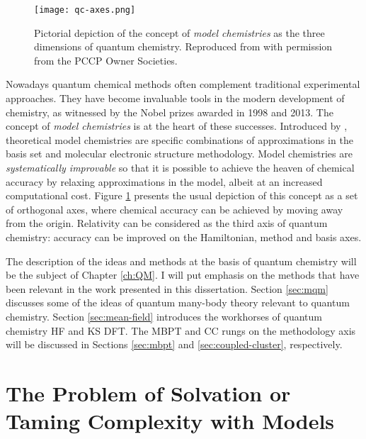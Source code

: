 \begin{figure}[tb]
\centering
\texttt{[image: qc-axes.png]}
\caption[Pictorial depiction of the concept of \emph{model chemistries}.]{
Pictorial depiction of the concept of \emph{model chemistries} as the
three dimensions of quantum chemistry.\autocite{Pople1999-gt, Saue2011-qg}
Reproduced from  with permission from the PCCP Owner Societies.
}
\label{fig:RQC-axis}
\end{figure}

 Nowadays
quantum chemical methods often complement traditional experimental
approaches. They have become invaluable tools in the modern development
of chemistry,\autocite{Lee1995-pw, Helgaker2004-oz, Tajti2004-ye} as
witnessed by the Nobel prizes awarded in 1998\autocite{Nobel1998} and
2013.\autocite{Nobel2013}
The concept of \emph{model chemistries} is at the heart of these
successes. Introduced by \citeauthor{Pople1999-gt}, theoretical model
chemistries are specific combinations of approximations in the basis set
and molecular electronic structure methodology.\autocite{Pople1999-gt}
Model chemistries are \emph{systematically improvable} so that it is
possible to achieve the heaven of chemical accuracy by relaxing
approximations in the model, albeit at an increased computational cost.
Figure \ref{fig:RQC-axis} presents the usual depiction of this concept
as a set of orthogonal axes, where chemical accuracy can be achieved by
moving away from the origin.
Relativity can be considered as the third axis of quantum
chemistry: accuracy can be improved on the Hamiltonian, method
and basis axes.\autocite{Saue2011-qg}

The description of the ideas and methods at the basis of quantum
chemistry will be the subject of Chapter \ref{ch:QM}.
I will put emphasis on the methods that have been relevant in the work
presented in this dissertation. Section \ref{sec:mqm} discusses some of the
ideas of quantum many-body theory relevant to quantum chemistry. Section
\ref{sec:mean-field} introduces the workhorses of quantum chemistry
\acrlong*{HF} and \acrlong*{KS} \acrlong*{DFT}.
The \acrlong*{MBPT} and \acrlong*{CC} rungs on the methodology axis will
be discussed in Sections \ref{sec:mbpt} and \ref{sec:coupled-cluster},
respectively.

\section*{The Problem of Solvation or Taming Complexity with Models}

